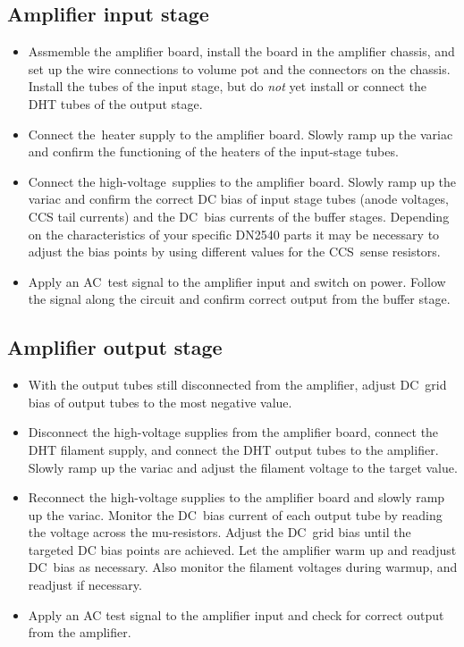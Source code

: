 \subsection{Amplifier input stage}
\begin{itemize}
\item Assmemble the amplifier board, install the board in the amplifier chassis, and set up the wire connections to volume pot and the connectors on the chassis. Install the tubes of the input stage, but do \emph{not} yet install or connect the DHT tubes of the output stage.
\item Connect the heater supply to the amplifier board. Slowly ramp up the variac and confirm the functioning of the heaters of the input-stage tubes.
\item Connect the high-voltage supplies to the amplifier board. Slowly ramp up the variac and confirm the correct DC bias of input stage tubes (anode voltages, CCS tail currents) and the DC bias currents of the buffer stages. Depending on the characteristics of your specific DN2540 parts it may be necessary to adjust the bias points by using different values for the CCS sense resistors.
\item Apply an AC test signal to the amplifier input and switch on power. Follow the signal along the circuit and confirm correct output from the buffer stage.
\end{itemize}


\subsection{Amplifier output stage}
\begin{itemize}
\item With the output tubes still disconnected from the amplifier, adjust DC grid bias of output tubes to the most negative value.
\item Disconnect the high-voltage supplies from the amplifier board, connect the DHT filament supply, and connect the DHT output tubes to the amplifier. Slowly ramp up the variac and adjust the filament voltage to the target value.
\item Reconnect the high-voltage supplies to the amplifier board and slowly ramp up the variac. Monitor the DC bias current of each output tube by reading the voltage across the mu-resistors. Adjust the DC grid bias until the targeted DC bias points are achieved. Let the amplifier warm up and readjust DC bias as necessary. Also monitor the filament voltages during warmup, and readjust if necessary.
\item Apply an AC test signal to the amplifier input and check for correct output from the amplifier.
\end{itemize}



